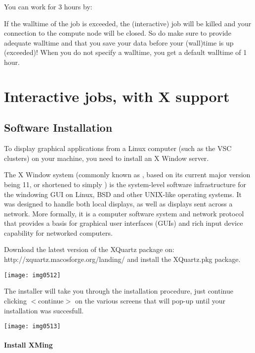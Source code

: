 You can work for 3 hours by:
\begin{prompt}
\end{prompt}

If the walltime of the job is exceeded, the (interactive) job will be killed
and your connection to the compute node will be closed. So do make sure to
provide adequate walltime and that you save your data before your (wall)time is
up (exceeded)!  When you do not specify a walltime, you get a default walltime
of 1 hour.

\section{Interactive jobs, with X support}

\subsection{Software Installation}

To display graphical applications from a Linux computer (such as the VSC
clusters) on your machine, you need to install an X Window server.

The X Window system (commonly known as , based on its current major
version being 11, or shortened to simply ) is the system-level
software infrastructure for the windowing GUI on Linux, BSD and other UNIX-like
operating systems. It was designed to handle both local displays, as well as
displays sent across a network. More formally, it is a computer software system
and network protocol that provides a basis for graphical user interfaces (GUIs)
and rich input device capability for networked computers.

\ifmac
Download the latest version of the XQuartz package on:
http://xquartz.macosforge.org/landing/
and install the XQuartz.pkg package.

\texttt{[image: img0512]}

The installer will take you through the installation procedure, just continue
clicking $<$continue$>$ on the various screens that will pop-up until your
installation was succesfull.

\texttt{[image: img0513]}
\fi

\ifwindows
\paragraph{ Install XMing}

